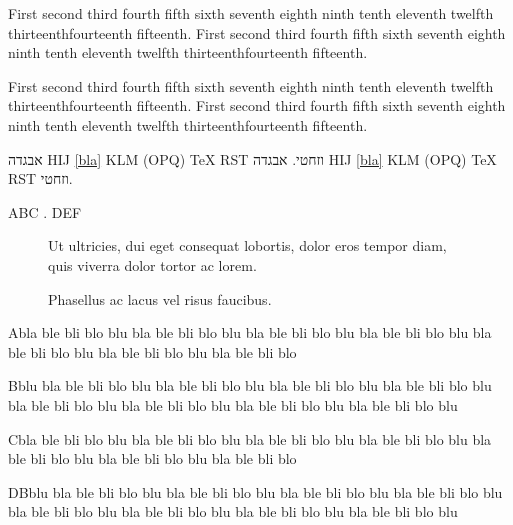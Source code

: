 \documentclass[a4paper]{book}
\begin{document}
{\raggedright First second third fourth fifth sixth seventh eighth
ninth tenth eleventh twelfth thirteenthfourteenth fifteenth. First
second third fourth fifth sixth seventh eighth ninth tenth eleventh
twelfth thirteenthfourteenth fifteenth.\par}

\bigskip

{\raggedleft First second third fourth fifth sixth seventh eighth
ninth tenth eleventh twelfth thirteenthfourteenth fifteenth. First
second third fourth fifth sixth seventh eighth ninth tenth eleventh
twelfth thirteenthfourteenth fifteenth.\par}

\bigskip

\ifx\XeTeXinputencoding\undefined
  \ifx\directlua\undefined
  \else
אבגדה HIJ \ref{bla} KLM \thetable{} (OPQ) \TeX{} RST וזחטי.
  \fi
\else
אבגדה HIJ \ref{bla} KLM \thetable{} (OPQ) \TeX{} RST וזחטי.
\fi

ABC . DEF

\begin{figure}
\centering
{}
\caption{Ut ultricies, dui eget consequat lobortis, dolor eros tempor
diam, quis viverra dolor tortor ac lorem.}
\end{figure}

\begin{figure}
\centering
{}
\caption{Phasellus ac lacus vel risus faucibus.}
\end{figure}


Abla ble bli blo blu bla ble bli blo blu bla ble bli blo blu bla ble
bli blo blu bla ble bli blo blu bla ble bli blo blu bla ble bli blo

Bblu bla ble bli blo blu bla ble bli blo blu bla ble bli blo blu bla
ble bli blo blu bla ble bli blo blu bla ble bli blo blu bla ble bli
blo blu bla ble bli blo blu

Cbla ble bli blo blu bla ble bli blo blu bla ble bli blo blu bla ble
bli blo blu bla ble bli blo blu bla ble bli blo blu bla ble bli blo

DBblu bla ble bli blo blu bla ble bli blo blu bla ble bli blo blu bla
ble bli blo blu bla ble bli blo blu bla ble bli blo blu bla ble bli
blo blu bla ble bli blo blu
\end{document}

